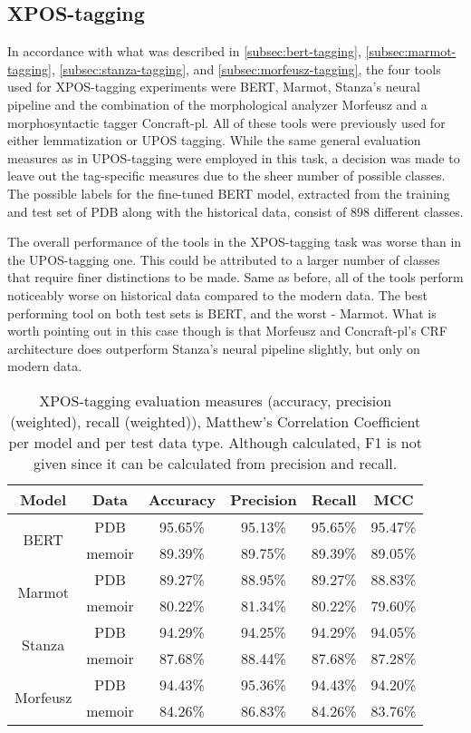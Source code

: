 \subsection{XPOS-tagging}
\label{subsec:xpos-tagging}

In accordance with what was described in \autoref{subsec:bert-tagging}, \autoref{subsec:marmot-tagging}, \autoref{subsec:stanza-tagging}, and \autoref{subsec:morfeusz-tagging}, the four tools used for XPOS-tagging experiments were BERT, Marmot, Stanza's neural pipeline and the combination of the morphological analyzer Morfeusz and a morphosyntactic tagger Concraft-pl. All of these tools were previously used for either lemmatization or UPOS tagging. While the same general evaluation measures as in UPOS-tagging were employed in this task, a decision was made to leave out the tag-specific measures due to the sheer number of possible classes. The possible labels for the fine-tuned BERT model, extracted from the training and test set of PDB along with the historical data, consist of 898 different classes. 

The overall performance of the tools in the XPOS-tagging task was worse than in the UPOS-tagging one. This could be attributed to a larger number of classes that require finer distinctions to be made. Same as before, all of the tools perform noticeably worse on historical data compared to the modern data. The best performing tool on both test sets is BERT, and the worst - Marmot. What is worth pointing out in this case though is that Morfeusz and Concraft-pl's CRF architecture does outperform Stanza's neural pipeline slightly, but only on modern data.  

\renewcommand{\arraystretch}{1.25}
\begin{table}[H]
\begin{center}
\begin{tabular}{|cc|cccc|}
\hline \bf Model & \bf Data & \bf Accuracy & \bf Precision & \bf Recall & \bf MCC \\ \hline
\multirow{2}{4em}{BERT}
& PDB & 95.65\% & 95.13\% & 95.65\% & 95.47\% \\
& memoir & 89.39\% & 89.75\% & 89.39\% & 89.05\%  \\
\multirow{2}{4em}{Marmot}
& PDB & 89.27\% & 88.95\% & 89.27\% & 88.83\% \\
& memoir & 80.22\% & 81.34\% & 80.22\% & 79.60\% \\
\multirow{2}{4em}{Stanza}
& PDB & 94.29\% & 94.25\% & 94.29\% & 94.05\% \\
& memoir & 87.68\% & 88.44\% & 87.68\% & 87.28\% \\
\multirow{2}{4em}{Morfeusz}
& PDB & 94.43\% & 95.36\% & 94.43\% & 94.20\% \\
& memoir & 84.26\% & 86.83\% & 84.26\% & 83.76\% \\ 
\hline
\end{tabular}
\caption{\label{table:xpos} XPOS-tagging evaluation measures (accuracy, precision (weighted), recall (weighted)), Matthew's Correlation Coefficient per model and per test data type. Although calculated, F1 is not given since it can be calculated from precision and recall.}
\end{center}
\end{table}

